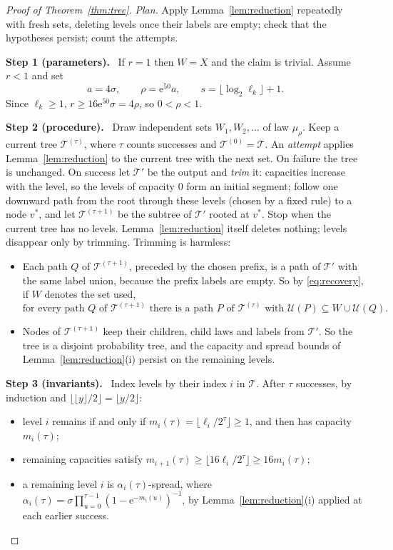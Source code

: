 \documentclass[11pt]{article}
\numberwithin{equation}{section}
\newcommand{\TT}{\mathcal T}
\newcommand{\UU}{\mathcal U}
\newcommand{\ee}{\mathrm e}
\newcommand{\step}[1]{\par\smallskip\noindent\textbf{Step #1.}\ }
\begin{document}
\begin{proof}[Proof of Theorem~\ref{thm:tree}]
\emph{Plan.} Apply Lemma~\ref{lem:reduction} repeatedly with fresh sets,
deleting levels once their labels are empty; check that the hypotheses
persist; count the attempts.

\step{1 (parameters)} If $r=1$ then $W=X$ and the claim is trivial.
Assume $r<1$ and set
\[
 a=4\sigma,\qquad\rho=\ee^{50}a,\qquad
 s=\lfloor\log_2\ell_k\rfloor+1.
\]
Since $\ell_k\ge1$, $r\ge16\ee^{50}\sigma=4\rho$, so $0<\rho<1$.

\step{2 (procedure)} Draw independent sets $W_1,W_2,\ldots$ of law
$\mu_\rho$. Keep a current tree $\TT^{(\tau)}$, where $\tau$ counts
successes and $\TT^{(0)}=\TT$. An \emph{attempt} applies
Lemma~\ref{lem:reduction} to the current tree with the next set. On
failure the tree is unchanged. On success let $\TT'$ be the output and
\emph{trim} it: capacities increase with the level, so the levels of
capacity $0$ form an initial segment; follow one downward path from the
root through these levels (chosen by a fixed rule) to a node $v^*$, and
let $\TT^{(\tau+1)}$ be the subtree of $\TT'$ rooted at $v^*$. Stop when
the current tree has no levels. Lemma~\ref{lem:reduction} itself deletes
nothing; levels disappear only by trimming. Trimming is harmless:
\begin{itemize}[itemsep=1pt,topsep=2pt]
 \item Each path $Q$ of $\TT^{(\tau+1)}$, preceded by the chosen prefix,
 is a path of $\TT'$ with the same label union, because the prefix labels
 are empty. So by \eqref{eq:recovery}, if $W$ denotes the set used,
 \begin{equation}\label{eq:trim-recovery}
  \text{for every path }Q\text{ of }\TT^{(\tau+1)}\text{ there is a path }
  P\text{ of }\TT^{(\tau)}\text{ with }\UU(P)\subseteq W\cup\UU(Q).
 \end{equation}
 \item Nodes of $\TT^{(\tau+1)}$ keep their children, child laws and
 labels from $\TT'$. So the tree is a disjoint probability tree, and the
 capacity and spread bounds of Lemma~\ref{lem:reduction}(i) persist on
 the remaining levels.
\end{itemize}

\step{3 (invariants)} Index levels by their index $i$ in $\TT$. After
$\tau$ successes, by induction and
$\lfloor\lfloor y\rfloor/2\rfloor=\lfloor y/2\rfloor$:
\begin{itemize}[itemsep=1pt,topsep=2pt]
 \item level $i$ remains if and only if
 $m_i(\tau)=\lfloor\ell_i/2^\tau\rfloor\ge1$, and then has capacity
 $m_i(\tau)$;
 \item remaining capacities satisfy
 $m_{i+1}(\tau)\ge\lfloor16\ell_i/2^\tau\rfloor\ge16m_i(\tau)$;
 \item a remaining level $i$ is $\alpha_i(\tau)$-spread, where
 $\alpha_i(\tau)=\sigma\prod_{u=0}^{\tau-1}(1-\ee^{-m_i(u)})^{-1}$, by
 Lemma~\ref{lem:reduction}(i) applied at each earlier success.
\end{itemize}


\end{proof}
\end{document}
